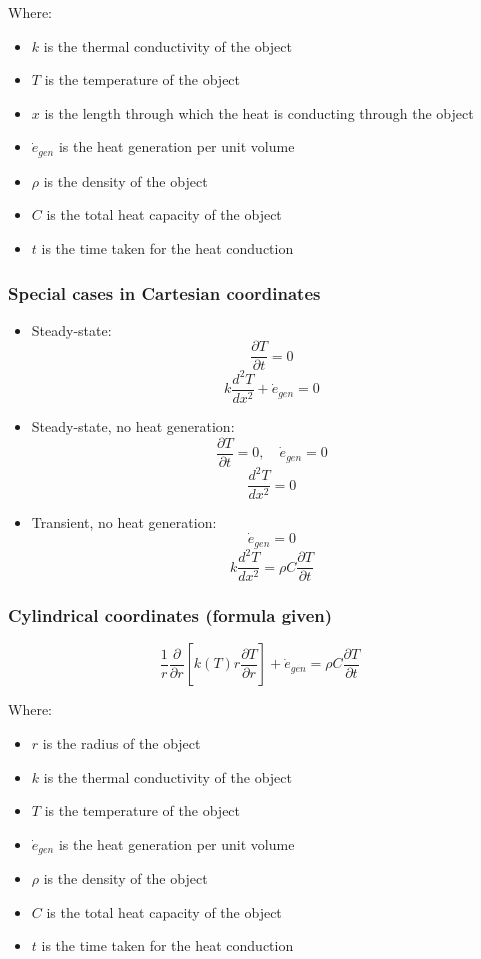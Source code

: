 \documentclass[11pt]{article}
\begin{document}
Where:
\begin{itemize}
\item \(k\) is the thermal conductivity of the object
\item \(T\) is the temperature of the object
\item \(x\) is the length through which the heat is conducting through the object
\item \(\dot{e}_{gen}\) is the heat generation per unit volume
\item \(\rho\) is the density of the object
\item \(C\) is the total heat capacity of the object
\item \(t\) is the time taken for the heat conduction
\end{itemize}

 \newpage

\subsubsection{Special cases in Cartesian coordinates}
\label{sec:org6e6d7ee}
\begin{itemize}
\item Steady-state:
\[\frac{\partial T}{\partial t} = 0\]
\[k \frac{d^2 T}{dx^2} + \dot{e}_{gen} = 0\]
\item Steady-state, no heat generation:
\[\frac{\partial T}{\partial t} = 0, \quad \dot{e}_{gen} = 0\]
\[\frac{d^2 T}{dx^2} = 0\]
\item Transient, no heat generation:
\[\dot{e}_{gen} = 0\]
\[k \frac{d^2 T}{dx^2} = \rho C \frac{\partial T}{\partial t}\]
\end{itemize}

\subsubsection{Cylindrical coordinates (formula given)}
\label{sec:orgedabe51}
\[\frac{1}{r} \frac{\partial}{\partial r} \left[k(T) r \frac{\partial T}{\partial r} \right] + \dot{e}_{gen} = \rho C \frac{\partial T}{\partial t}\]

Where:
\begin{itemize}
\item \(r\) is the radius of the object
\item \(k\) is the thermal conductivity of the object
\item \(T\) is the temperature of the object
\item \(\dot{e}_{gen}\) is the heat generation per unit volume
\item \(\rho\) is the density of the object
\item \(C\) is the total heat capacity of the object
\item \(t\) is the time taken for the heat conduction
\end{itemize}
\end{document}
